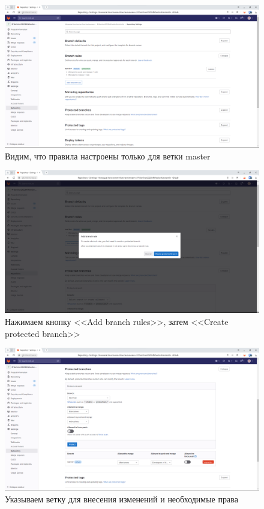 \documentclass[a4paper]{article}
\begin{document}
  \begin{figure}[H]
    \centering
    \includegraphics[width=\textwidth]{1_ (42)}
    \caption{Видим, что правила настроены только для ветки master}
  \end{figure}

  \begin{figure}[H]
    \centering
    \includegraphics[width=\textwidth]{1_ (41)}
    \caption{Нажимаем кнопку <<Add branch rules>>, затем <<Create protected branch>>}
  \end{figure}

  \begin{figure}[H]
    \centering
    \includegraphics[width=\textwidth]{1_ (40)}
    \caption{Указываем ветку для внесения изменений и необходимые права}
  \end{figure}
\end{document}
